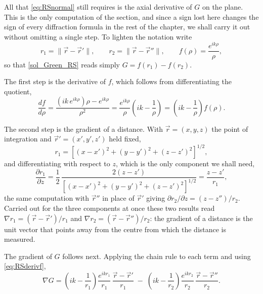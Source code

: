		All that \eqref{eq:RSnormal} still requires is the axial derivative of $G$ on the plane. This is the only computation of the section, and since a sign lost here changes the sign of every diffraction formula in the rest of the chapter, we shall carry it out without omitting a single step. To lighten the notation write
		\begin{equation}\label{eq:RSDistances}
			r_{1} = \|\vec{r}-\vec{r}'\|, \qquad r_{2} = \|\vec{r}-\vec{r}''\|, \qquad f(\rho) = \dfrac{e^{ik\rho}}{\rho},
		\end{equation}
		so that \eqref{sol_Green_RS} reads simply $G = f(r_{1}) - f(r_{2})$.

		The first step is the derivative of $f$, which follows from differentiating the quotient,
		\begin{equation}\label{eq:RSderivf}
			\dfrac{df}{d\rho} = \dfrac{\left(ik\,e^{ik\rho}\right)\rho - e^{ik\rho}}{\rho^{2}} = \dfrac{e^{ik\rho}}{\rho}\left(ik - \dfrac{1}{\rho}\right) = \left(ik-\dfrac{1}{\rho}\right)f(\rho).
		\end{equation}

		The second step is the gradient of a distance. With $\vec{r} = (x,y,z)$ the point of integration and $\vec{r}' = (x',y',z')$ held fixed,
		\begin{equation}\label{eq:RSr1}
			r_{1} = \left[(x-x')^{2}+(y-y')^{2}+(z-z')^{2}\right]^{1/2},
		\end{equation}
		and differentiating with respect to $z$, which is the only component we shall need,
		\begin{equation}\label{eq:RSdr1dz}
			\dfrac{\partial r_{1}}{\partial z} = \dfrac{1}{2}\,\dfrac{2\left(z-z'\right)}{\left[(x-x')^{2}+(y-y')^{2}+(z-z')^{2}\right]^{1/2}} = \dfrac{z-z'}{r_{1}} ,
		\end{equation}
		the same computation with $\vec{r}''$ in place of $\vec{r}'$ giving $\partial r_{2}/\partial z = (z-z'')/r_{2}$. Carried out for the three components at once these two results read $\nabla r_{1} = (\vec{r}-\vec{r}')/r_{1}$ and $\nabla r_{2} = (\vec{r}-\vec{r}'')/r_{2}$: the gradient of a distance is the unit vector that points away from the centre from which the distance is measured.

		The gradient of $G$ follows next. Applying the chain rule to each term and using \eqref{eq:RSderivf},
		\begin{equation}\label{eq:RSgradG}
			\nabla G = \left(ik-\dfrac{1}{r_{1}}\right)\dfrac{e^{ikr_{1}}}{r_{1}}\,\dfrac{\vec{r}-\vec{r}'}{r_{1}} \;-\; \left(ik-\dfrac{1}{r_{2}}\right)\dfrac{e^{ikr_{2}}}{r_{2}}\,\dfrac{\vec{r}-\vec{r}''}{r_{2}} .
		\end{equation}

